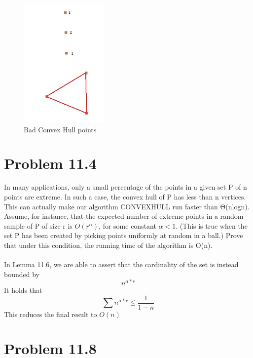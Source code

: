 \documentclass[11pt,psfig]{article}
\begin{document}
\begin{figure}[H]
\centering
\includegraphics[height=2.5in]{hw8prob1diagram.jpg}
\caption{Bad Convex Hull points}
\end{figure}

\newpage

\section*{Problem 11.4}

In many applications, only a small percentage of the points in a given set
P of n points are extreme. In such a case, the convex hull of P has less
than n vertices. This can actually make our algorithm CONVEXHULL
run faster than Θ(nlogn).\\

Assume, for instance, that the expected number of extreme points in a
random sample of P of size r is $O(r^\alpha)$, for some constant $\alpha < 1$. (This
is true when the set P has been created by picking points uniformly at
random in a ball.) Prove that under this condition, the running time of
the algorithm is O(n).
\\
\\
In Lemma 11.6, we are able to assert that the cardinality of the set is instead bounded by
\[
n^{\alpha*r}
\]
It holds that
\[
\sum{n^{\alpha*r}} \leq \frac{1}{1-n}
\]
This reduces the final result to $O(n)$

\newpage

\section*{Problem 11.8}
\end{document}
